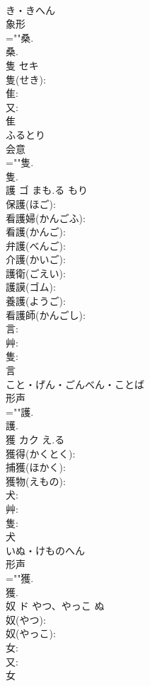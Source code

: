 \documentclass[8pt]{extreport}
\begin{document}
\begin{CJK}{UTF8}{min}
\\	き・きへん	
\\	象形 
\\	=""桑.
\\	桑.
\\	隻	セキ			
\\	隻(せき): 
\\	隹: 
\\	又: 
\\	隹	
\\	ふるとり	
\\	会意 
\\	=""隻.
\\	隻.
\\	護	ゴ	まも.る	もり	
\\	保護(ほご): 
\\	看護婦(かんごふ): 
\\	看護(かんご): 
\\	弁護(べんご): 
\\	介護(かいご): 
\\	護衛(ごえい): 
\\	護謨(ゴム): 
\\	養護(ようご): 
\\	看護師(かんごし): 
\\	言: 
\\	艸: 
\\	隻: 
\\	言	
\\	こと・げん・ごんべん・ことば	
\\	形声 
\\	=""護.
\\	護.
\\	獲	カク	え.る		
\\	獲得(かくとく): 
\\	捕獲(ほかく): 
\\	獲物(えもの): 
\\	犬: 
\\	艸: 
\\	隻: 
\\	犬	
\\	いぬ・けものへん	
\\	形声 
\\	=""獲.
\\	獲.
\\	奴	ド	やつ、やっこ	ぬ	
\\	奴(やつ): 
\\	奴(やっこ): 
\\	女: 
\\	又: 
\\	女	

\end{CJK}
\end{document}
